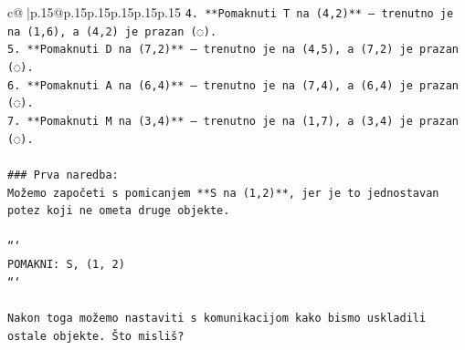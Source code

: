 \documentclass{article}
\begin{document}
{\begin{supertabular}{c@{$\;$}|p{.15\linewidth}@{}p{.15\linewidth}p{.15\linewidth}p{.15\linewidth}p{.15\linewidth}p{.15\linewidth}}
{{{\texttt{4. **Pomaknuti T na (4,2)** – trenutno je na (1,6), a (4,2) je prazan (◌).} \\
\texttt{5. **Pomaknuti D na (7,2)** – trenutno je na (4,5), a (7,2) je prazan (◌).} \\
\texttt{6. **Pomaknuti A na (6,4)** – trenutno je na (7,4), a (6,4) je prazan (◌).} \\
\texttt{7. **Pomaknuti M na (3,4)** – trenutno je na (1,7), a (3,4) je prazan (◌).} \\
\\ 
\texttt{\#\#\# Prva naredba:} \\
\texttt{Možemo započeti s pomicanjem **S na (1,2)**, jer je to jednostavan potez koji ne ometa druge objekte.} \\
\\ 
\texttt{```} \\
\texttt{POMAKNI: S, (1, 2)} \\
\texttt{```} \\
\\ 
\texttt{Nakon toga možemo nastaviti s komunikacijom kako bismo uskladili ostale objekte. Što misliš?} \\
            }
        }
    }
     \\ \\


\end{supertabular}}
\end{document}
